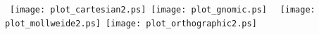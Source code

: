 \documentclass[landscape]{report}
\begin{document}
\thispagestyle{empty}
\vbox{
\vskip -2cm
\hbox{
\texttt{[image: plot\_cartesian2.ps]}
\hfill
\texttt{[image: plot\_gnomic.ps]}
}
\hbox{
\texttt{[image: plot\_mollweide2.ps]}
\hfill
\texttt{[image: plot\_orthographic2.ps]}
}
}
\end{document}
